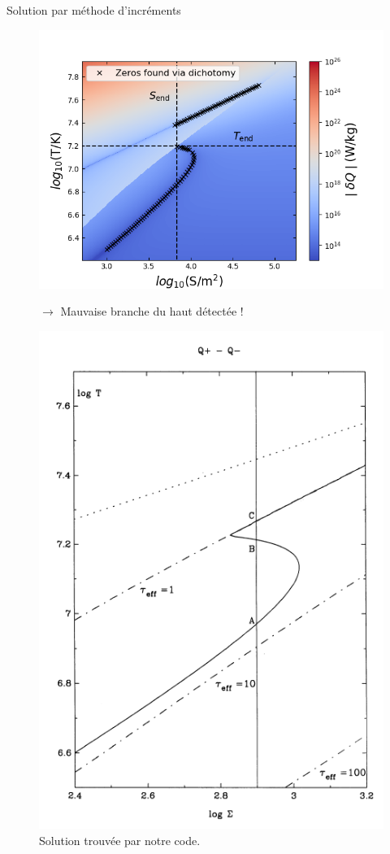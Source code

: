 \documentclass{beamer}
\begin{document}
\begin{frame}{Solution par méthode d'incréments}
    \begin{figure}[ht]
      \begin{minipage}[ht]{0.48\linewidth}
        \centering
        \includegraphics[width=\textwidth]{Nice_S_curve}
        \caption{Solution trouvée par notre code.}
        $\rightarrow$ Mauvaise branche du haut détectée !
      \end{minipage}
      \hspace{5pt}
      \begin{minipage}[ht]{0.4\linewidth}
        \centering
        \includegraphics[width=\textwidth]{LasotaScurve2.png}

\end{minipage}
\end{figure}
\end{frame}
\end{document}
